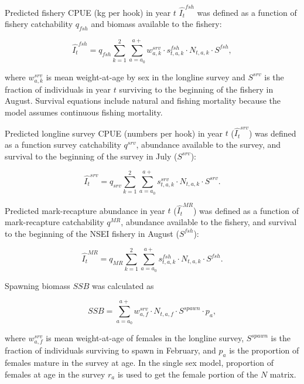 \documentclass[]{article}
\begin{document}
Predicted fishery CPUE (kg per hook) in year \(t\) \(\hat{I_t}^{fsh}\)
was defined as a function of fishery catchability \(q_{fsh}\) and
biomass available to the fishery:

\begin{equation}
\hat{I_t}^{fsh}=q_{fsh}\sum_{k=1}^{2}\sum_{a=a_0}^{a+}w_{a,k}^{srv} \cdot s_{t,a,k}^{fsh} \cdot N_{t,a,k} \cdot S^{fsh},
\label{eq:predfshcpue}
\end{equation}

where \(w_{a,k}^{srv}\) is mean weight-at-age by sex in the longline
survey and \(S^{srv}\) is the fraction of individuals in year \(t\)
surviving to the beginning of the fishery in August. Survival equations
include natural and fishing mortality because the model assumes
continuous fishing mortality.

Predicted longline survey CPUE (numbers per hook) in year \(t\)
(\(\hat{I_t}^{srv}\)) was defined as a function survey catchability
\(q^{srv}\), abundance available to the survey, and survival to the
beginning of the survey in July (\(S^{srv}\)):

\begin{equation}
\hat{I_t}^{srv}=q_{srv}\sum_{k=1}^{2}\sum_{a=a_0}^{a+}s_{t,a,k}^{srv} \cdot N_{t,a,k} \cdot S^{srv}.
\label{eq:predsrvcpue}
\end{equation}

Predicted mark-recapture abundance in year \(t\) (\(\hat{I_t}^{MR}\))
was defined as a function of mark-recapture catchability \(q^{MR}\),
abundance available to the fishery, and survival to the beginning of the
NSEI fishery in August (\(S^{fsh}\)):

\begin{equation}
\hat{I_t}^{MR}=q_{MR}\sum_{k=1}^{2}\sum_{a=a_0}^{a+}s_{t,a,k}^{fsh} \cdot N_{t,a,k} \cdot S^{fsh}.
\label{eq:predmr}
\end{equation}

Spawning biomass \(SSB\) was calculated as

\begin{equation}
SSB=\sum_{a=a_0}^{a+} w_{a,f}^{srv} \cdot N_{t,a,f} \cdot S^{spawn} \cdot p_a,
\label{eq:ssb}
\end{equation}

where \(w_{a,f}^{srv}\) is mean weight-at-age of females in the longline
survey, \(S^{spawn}\) is the fraction of individuals surviving to spawn
in February, and \(p_a\) is the proportion of females mature in the
survey at age. In the single sex model, proportion of females at age in
the survey \(r_a\) is used to get the female portion of the \(N\)
matrix.
\end{document}
